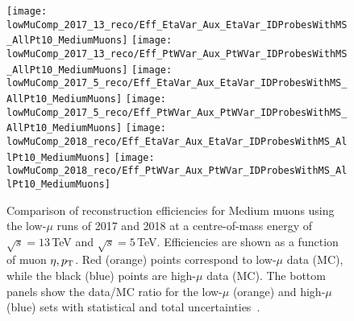	\begin{figure}
		\centering
		\texttt{[image: lowMuComp\_2017\_13\_reco/Eff\_EtaVar\_Aux\_EtaVar\_IDProbesWithMS\_AllPt10\_MediumMuons]}%
		\texttt{[image: lowMuComp\_2017\_13\_reco/Eff\_PtWVar\_Aux\_PtWVar\_IDProbesWithMS\_AllPt10\_MediumMuons]}
		\texttt{[image: lowMuComp\_2017\_5\_reco/Eff\_EtaVar\_Aux\_EtaVar\_IDProbesWithMS\_AllPt10\_MediumMuons]}%
	\texttt{[image: lowMuComp\_2017\_5\_reco/Eff\_PtWVar\_Aux\_PtWVar\_IDProbesWithMS\_AllPt10\_MediumMuons]}
		\texttt{[image: lowMuComp\_2018\_reco/Eff\_EtaVar\_Aux\_EtaVar\_IDProbesWithMS\_AllPt10\_MediumMuons]}%
	\texttt{[image: lowMuComp\_2018\_reco/Eff\_PtWVar\_Aux\_PtWVar\_IDProbesWithMS\_AllPt10\_MediumMuons]}
	
		\caption{Comparison of reconstruction efficiencies for Medium muons
			using the low-$\mu$ runs of 2017 and 2018 at a centre-of-mass energy of
			$\sqrt{s}=13\,$TeV and $\sqrt{s}=5\,$TeV. Efficiencies are
			shown as a function of muon $\eta, p_{\text{T}}$. Red (orange) points correspond to low-$\mu$ data (MC),
			while the black (blue) points are high-$\mu$ data (MC). The bottom
			panels show the data/MC ratio for the low-$\mu$ (orange) and
			high-$\mu$ (blue) sets with statistical and total
			uncertainties~\cite{int_note_muons}.}\label{app:fig:lowMu2}
	\end{figure}
	
